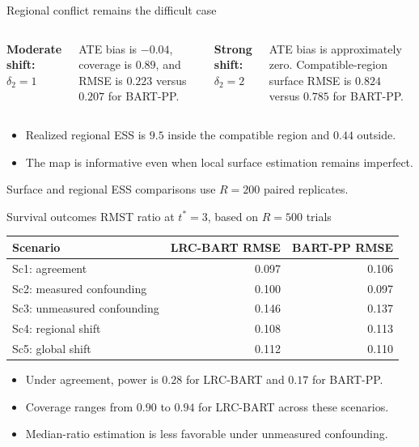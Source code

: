 \documentclass[11pt,aspectratio=169]{beamer}
\begin{document}
\begin{frame}{Regional conflict remains the difficult case}
  \large
  \begin{columns}[T,onlytextwidth]
      \textbf{\color{UChicagoMaroon}Moderate shift: \(\delta_2=1\)}

      \vspace{0.35em}
      ATE bias is $-0.04$, coverage is $0.89$, and RMSE is $0.223$ versus $0.207$ for BART-PP.

      \textbf{\color{UChicagoMaroon}Strong shift: \(\delta_2=2\)}

      \vspace{0.35em}
      ATE bias is approximately zero. Compatible-region surface RMSE is $0.824$ versus $0.785$ for BART-PP.
  \end{columns}

  \vspace{1.0em}
  \begin{itemize}\setlength\itemsep{0.55em}
    \item Realized regional ESS is $9.5$ inside the compatible region and $0.44$ outside.
    \item The map is informative even when local surface estimation remains imperfect.
  \end{itemize}

  \vfill
  {\scriptsize Surface and regional ESS comparisons use $R=200$ paired replicates.}
\end{frame}

\begin{frame}{Survival outcomes}
  \small
  \centering
  RMST ratio at $t^\ast=3$, based on $R=500$ trials

  \vspace{0.3em}
  \renewcommand{\arraystretch}{1.14}
  \setlength{\tabcolsep}{7pt}
  \begin{tabular}{lrr}
    \toprule
    Scenario & LRC-BART RMSE & BART-PP RMSE \\
    \midrule
    Sc1: agreement & 0.097 & 0.106 \\
    Sc2: measured confounding & 0.100 & 0.097 \\
    Sc3: unmeasured confounding & 0.146 & 0.137 \\
    Sc4: regional shift & 0.108 & 0.113 \\
    Sc5: global shift & 0.112 & 0.110 \\
    \bottomrule
  \end{tabular}

  \vspace{0.7em}
  \begin{itemize}\setlength\itemsep{0.45em}
    \item Under agreement, power is $0.28$ for LRC-BART and $0.17$ for BART-PP.
    \item Coverage ranges from $0.90$ to $0.94$ for LRC-BART across these scenarios.
    \item Median-ratio estimation is less favorable under unmeasured confounding.
  \end{itemize}
\end{frame}
\end{document}
